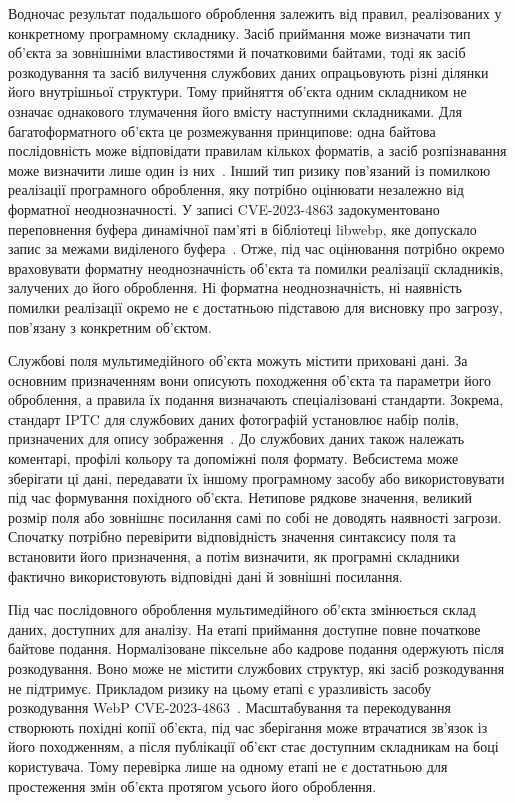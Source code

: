 Водночас результат подальшого оброблення залежить від правил, реалізованих у конкретному програмному складнику. Засіб приймання може визначати тип об’єкта за зовнішніми властивостями й початковими байтами, тоді як засіб розкодування та засіб вилучення службових даних опрацьовують різні ділянки його внутрішньої структури. Тому прийняття об’єкта одним складником не означає однакового тлумачення його вмісту наступними складниками. Для багатоформатного об’єкта це розмежування принципове: одна байтова послідовність може відповідати правилам кількох форматів, а засіб розпізнавання може визначити лише один із них~\cite{koch2022polyglot}. Інший тип ризику пов’язаний із помилкою реалізації програмного оброблення, яку потрібно оцінювати незалежно від форматної неоднозначності. У записі CVE-2023-4863 задокументовано переповнення буфера динамічної пам’яті в бібліотеці libwebp, яке допускало запис за межами виділеного буфера~\cite{nvd2023webp}. Отже, під час оцінювання потрібно окремо враховувати форматну неоднозначність об’єкта та помилки реалізації складників, залучених до його оброблення. Ні форматна неоднозначність, ні наявність помилки реалізації окремо не є достатньою підставою для висновку про загрозу, пов’язану з конкретним об’єктом.

Службові поля мультимедійного об’єкта можуть містити приховані дані. За основним призначенням вони описують походження об’єкта та параметри його оброблення, а правила їх подання визначають спеціалізовані стандарти. Зокрема, стандарт IPTC для службових даних фотографій установлює набір полів, призначених для опису зображення~\cite{iptc2024metadata}. До службових даних також належать коментарі, профілі кольору та допоміжні поля формату. Вебсистема може зберігати ці дані, передавати їх іншому програмному засобу або використовувати під час формування похідного об’єкта. Нетипове рядкове значення, великий розмір поля або зовнішнє посилання самі по собі не доводять наявності загрози. Спочатку потрібно перевірити відповідність значення синтаксису поля та встановити його призначення, а потім визначити, як програмні складники фактично використовують відповідні дані й зовнішні посилання.

Під час послідовного оброблення мультимедійного об’єкта змінюється склад даних, доступних для аналізу. На етапі приймання доступне повне початкове байтове подання. Нормалізоване піксельне або кадрове подання одержують після розкодування. Воно може не містити службових структур, які засіб розкодування не підтримує. Прикладом ризику на цьому етапі є уразливість засобу розкодування WebP CVE-2023-4863~\cite{nvd2023webp}. Масштабування та перекодування створюють похідні копії об’єкта, під час зберігання може втрачатися зв’язок із його походженням, а після публікації об’єкт стає доступним складникам на боці користувача. Тому перевірка лише на одному етапі не є достатньою для простеження змін об’єкта протягом усього його оброблення.

